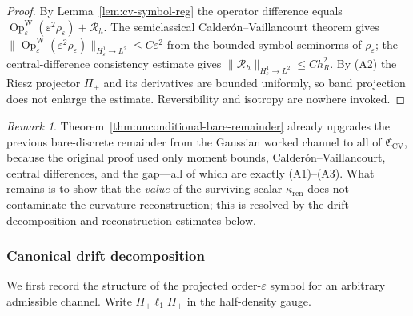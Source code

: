 \documentclass[11pt]{article}
\theoremstyle{definition}
\theoremstyle{remark}
\newtheorem{remark}[theorem]{Remark}
\newcommand{\eps}{\varepsilon}
\newcommand{\ren}{\mathrm{ren}}
\newcommand{\CV}{\mathfrak C_{\mathrm{CV}}}
\newcommand{\kren}{\kappa_{\ren}}
\newcommand{\Pip}{\Pi_+}
\newcommand{\OpW}{\operatorname{Op}^{\mathrm W}_\eps}
\begin{document}
\begin{proof}
By Lemma~\ref{lem:cv-symbol-reg} the operator difference equals
$\OpW(\eps^2\rho_\eps)+\mathcal R_h$.  The semiclassical Calder\'on--Vaillancourt
theorem \cite{CalderonVaillancourt,Zworski,DimassiSjostrand} gives
$\|\OpW(\eps^2\rho_\eps)\|_{H^1_\eps\to L^2}\le C\eps^2$ from the bounded symbol
seminorms of $\rho_\eps$; the central-difference consistency estimate gives
$\|\mathcal R_h\|_{H^1_\eps\to L^2}\le Ch_R^2$.  By (A2) the Riesz projector $\Pip$
and its derivatives are bounded uniformly, so band projection does not enlarge the
estimate.  Reversibility and isotropy are nowhere invoked.
\end{proof}

\begin{remark}
\label{rem:partI-scope}
Theorem~\ref{thm:unconditional-bare-remainder} already upgrades the previous bare-discrete
remainder from the Gaussian worked channel to all of $\CV$, because the original
proof used only moment bounds, Calder\'on--Vaillancourt, central differences, and
the gap---all of which are exactly (A1)--(A3).  What remains is to show that the
\emph{value} of the surviving scalar $\kren$ does not contaminate the curvature
reconstruction; this is resolved by the drift decomposition and reconstruction estimates below.
\end{remark}

\subsubsection{Canonical drift decomposition}
\label{sec:partII}

We first record the structure of the projected order-$\eps$ symbol for an
arbitrary admissible channel.  Write $\Pip\ell_1\Pip$ in the half-density gauge.
\end{document}
